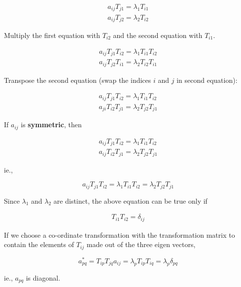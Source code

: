 \begin{equation}
\begin{array}{l}
a_{ij}T_{j1} = \lambda_1 T_{i1} \\
a_{ij}T_{j2} = \lambda_2 T_{i2}
\end{array}
\end{equation}

Multiply the first equation with $T_{i2}$ and the second equation with $T_{i1}$.

\begin{equation}
\begin{array}{l}
a_{ij}T_{j1} T_{i2} = \lambda_1 T_{i1} T_{i2} \\
a_{ij}T_{j2} T_{i1} = \lambda_2 T_{i2} T_{i1}
\end{array}
\end{equation}

Transpose the second equation (swap the indices $i$ and $j$ in second equation):

\begin{equation}
\begin{array}{l}
a_{ij}T_{j1} T_{i2} = \lambda_1 T_{i1} T_{i2} \\
a_{ji}T_{i2} T_{j1} = \lambda_2 T_{j2} T_{j1}
\end{array}
\end{equation}

If $a_{ij}$ is {\bf symmetric}, then

\begin{equation}
\begin{array}{l}
a_{ij}T_{j1} T_{i2} = \lambda_1 T_{i1} T_{i2} \\
a_{ij}T_{i2} T_{j1} = \lambda_2 T_{j2} T_{j1}
\end{array}
\end{equation}

ie.,

$$ a_{ij}T_{j1} T_{i2} = \lambda_1 T_{i1} T_{i2}  = \lambda_2 T_{j2} T_{j1} $$

Since $\lambda_1$ and $\lambda_2$ are distinct, the above equation can be true only if 

\begin{equation}
\begin{array}{l}
T_{i1} T_{i2}  = \delta_{ij}
\end{array}
\end{equation}

If we choose a co-ordinate transformation with the transformation matrix to contain the elements of $T_{ij}$ made out of the three eigen vectors,

$$ a_{pq}^* = T_{ip}T_{jq} a_{ij} = \lambda_p T_{ip}T_{iq} = \lambda_p \delta_{pq} $$

ie., $a_{pq}$ is diagonal. 


